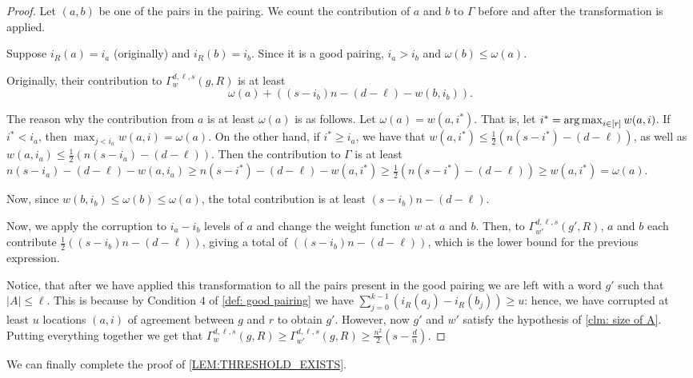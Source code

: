 \documentclass{article}
\def\argmax{\operatornamewithlimits{arg\,max}}
\begin{document}
	\begin{proof}
		Let $(a, b)$ be one of the pairs in the pairing. 
		We count the contribution of $a$ and $b$ to $\Gamma$ before and after the transformation is applied.
		
		Suppose $i_R(a) = i_a$ (originally) and $i_R(b) = i_b$. Since it is a good pairing, $i_a > i_b$ and $\omega(b) \leq \omega (a)$. 
		
		Originally, their contribution to $\Gamma_w^{d, \ell, s} (g, R)$ is at least \[\omega(a) + ((s-i_b)n - (d - \ell) - w(b, i_b)).\]
		
		The reason why the contribution from $a$ is at least $\omega(a)$ is as follows. Let $\omega(a) = w(a, i^*)$. That is, let $i^* = \argmax_{i \in [r]} {w(a, i)}$. If $i^* < i_a$, then $\max_{j<i_a} w(a, i) = \omega(a)$. On the other hand, if $i^* \geq i_a$, we have that $w(a, i^*) \leq \frac{1}{2}(n(s-i^*)-(d-\ell))$, as well as  $w(a, i_a) \leq \frac{1}{2}(n(s-i_a)-(d-\ell))$. Then the contribution to $\Gamma$ is at least $ n(s-i_a)-(d-\ell) - w(a, i_a) \geq n(s-i^*)-(d-\ell) - w(a, i^*) \geq \frac{1}{2}( n(s-i^*)-(d-\ell)) \geq w(a, i^*) = \omega(a)$.
		
		Now, since $w(b, i_b) \leq \omega(b) \leq \omega(a)$, the total contribution is at least $(s-i_b)n - (d - \ell)$.
		
		Now, we apply the corruption to $i_a - i_b$ levels of $a$ and change the weight function $w$ at $a$ and $b$.
		Then, to $\Gamma_{w'}^{d, \ell, s} (g', R)$, $a$ and $b$ each contribute $\frac{1}{2}((s-i_b)n - (d-\ell))$, giving a total of $((s-i_b)n - (d-\ell))$, which is the lower bound for the previous expression.
		
		Notice, that after we have applied this transformation to all the pairs present in the good pairing we are left with a word $g'$ such that $|A|\leq \ell$. This is because by Condition $4$ of \cref{def: good pairing} we have $\sum_{j=0}^{k-1} (i_R(a_j) - i_R(b_j)) \geq u$: hence, we have corrupted at least $u$ locations $(a,i)$ of agreement between $g$ and $r$ to obtain $g'$. However, now $g'$ and $w'$ satisfy the hypothesis of \autoref{clm: size of A}.
		Putting everything together we get that  $\Gamma_w^{d, \ell, s}(g, R) \geq \Gamma_{w'}^{d, \ell, s}(g, R)\geq \frac{n^2}{2}(s-\frac{d}{n})$.    
	\end{proof}
	
	We can finally complete the proof of \cref{LEM:THRESHOLD_EXISTS}.
	
\end{document}
